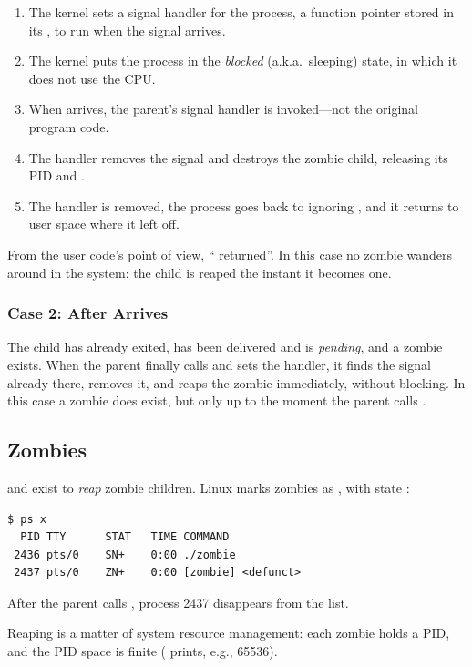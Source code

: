 \begin{enumerate}
  \item The kernel sets a  signal handler for the process, a function pointer stored in its \ts{}, to run when the signal arrives.
  \item The kernel puts the process in the \emph{blocked} (a.k.a.\ sleeping) state, in which it does not use the CPU.
  \item When  arrives, the parent's signal handler is invoked---not the original program code.
  \item The handler removes the signal and destroys the zombie child, releasing its PID and \ts{}.
  \item The handler is removed, the process goes back to ignoring , and it returns to user space where it left off.
\end{enumerate}
From the user code's point of view, `` returned''. In this case no zombie wanders around in the system: the child is reaped the instant it becomes one.

\subsubsection{Case 2: \texorpdfstring{}{wait()} After \texorpdfstring{}{SIGCHLD} Arrives}

The child has already exited,  has been delivered and is \emph{pending}, and a zombie exists. When the parent finally calls  and sets the handler, it finds the signal already there, removes it, and reaps the zombie immediately, without blocking. In this case a zombie does exist, but only up to the moment the parent calls .

\subsection{Zombies}

 and  exist to \emph{reap} zombie children. Linux marks zombies as , with state :
\begin{lstlisting}[style=sh]
$ ps x
  PID TTY      STAT   TIME COMMAND
 2436 pts/0    SN+    0:00 ./zombie
 2437 pts/0    ZN+    0:00 [zombie] <defunct>
\end{lstlisting}
After the parent calls , process 2437 disappears from the list.

Reaping is a matter of system resource management: each zombie holds a PID, and the PID space is finite ( prints, e.g., 65536).

